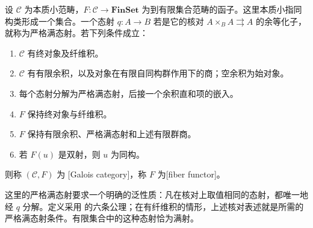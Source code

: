 \begin{definition}\label{b3:def:I-galois-category}
	设 \(\mathcal C\) 为本质小范畴，\(F:\mathcal C\rightarrow\mathbf{FinSet}\) 为到有限集合范畴的函子。这里本质小指同构类形成一个集合。一个态射 \(q:A\rightarrow B\) 若是它的核对 \(A\times_BA\rightrightarrows A\) 的余等化子，就称为严格满态射。若下列条件成立：
	\begin{enumerate}[label=(G\arabic*)]
		\item \(\mathcal C\) 有终对象及纤维积。
		\item \(\mathcal C\) 有有限余积，以及对象在有限自同构群作用下的商；空余积为始对象。
		\item 每个态射分解为严格满态射，后接一个余积直和项的嵌入。
		\item \(F\) 保持终对象与纤维积。
		\item \(F\) 保持有限余积、严格满态射和上述有限群商。
		\item 若 \(F(u)\) 是双射，则 \(u\) 为同构。
	\end{enumerate}
	则称 \((\mathcal C,F)\) 为 [Galois category]，称 \(F\) 为[fiber functor]。
\end{definition}

这里的严格满态射要求一个明确的泛性质：凡在核对上取值相同的态射，都唯一地经 \(q\) 分解。定义采用 \cite[Exposé V, \S4, p. 98]{SGA12003} 的六条公理；在有纤维积的情形，上述核对表述就是所需的严格满态射条件。有限集合中的这种态射恰为满射。

